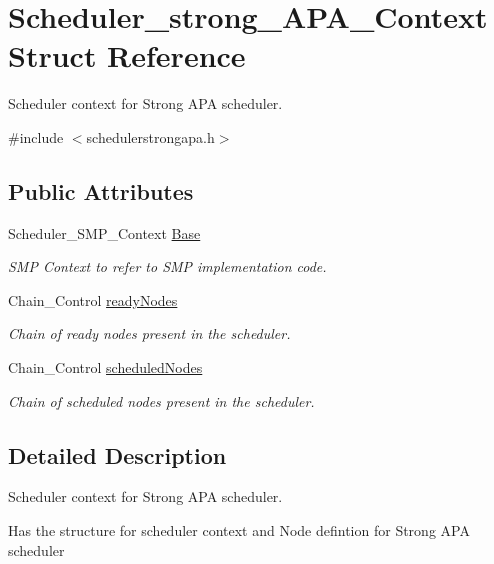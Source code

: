 \hypertarget{structScheduler__strong__APA__Context}{}\section{Scheduler\+\_\+strong\+\_\+\+A\+P\+A\+\_\+\+Context Struct Reference}
\label{structScheduler__strong__APA__Context}


Scheduler context for Strong A\+PA scheduler.  




{\ttfamily \#include $<$schedulerstrongapa.\+h$>$}

\subsection*{Public Attributes}
\begin{DoxyCompactItemize}
\item 
Scheduler\+\_\+\+S\+M\+P\+\_\+\+Context \hyperlink{structScheduler__strong__APA__Context_a55755b445b7e7beaf1b87b178521e615}{Base}
\begin{DoxyCompactList}\small\item\em S\+MP Context to refer to S\+MP implementation code. \end{DoxyCompactList}\item 
Chain\+\_\+\+Control \hyperlink{structScheduler__strong__APA__Context_a5b31ff1b54bde351d53a41abee3e91ed}{ready\+Nodes}
\begin{DoxyCompactList}\small\item\em Chain of ready nodes present in the scheduler. \end{DoxyCompactList}\item 
Chain\+\_\+\+Control \hyperlink{structScheduler__strong__APA__Context_a144c4296c745b8d5bfa5e3a00fe14e81}{scheduled\+Nodes}
\begin{DoxyCompactList}\small\item\em Chain of scheduled nodes present in the scheduler. \end{DoxyCompactList}\end{DoxyCompactItemize}


\subsection{Detailed Description}
Scheduler context for Strong A\+PA scheduler. 

Has the structure for scheduler context and Node defintion for Strong A\+PA scheduler 

